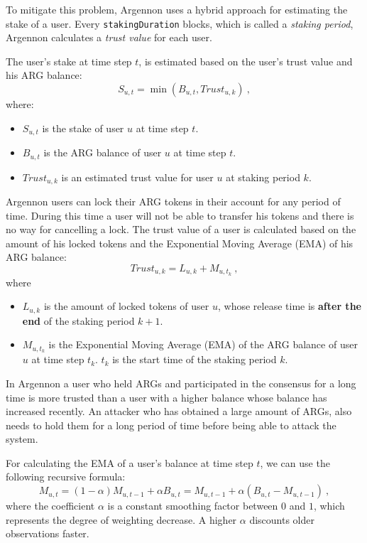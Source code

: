 To mitigate this problem, Argennon uses a hybrid approach for estimating the stake of a user.
Every \texttt{stakingDuration} blocks, which is called a \emph{staking period}, Argennon calculates
a \emph{trust value} for each user.

The user's stake
at time step \(t\), is estimated based on the user's trust value and his ARG balance:
\begin{equation}
    S_{u,t} = \min (B_{u,t}, Trust_{u,k})\ ,\label{eq:stake}
\end{equation}
where:
\begin{itemize}
    \item \(S_{u,t}\) is the stake of user \(u\) at time step \(t\).
    \item \(B_{u,t}\) is the ARG balance of user \(u\) at time step \(t\).
    \item \(Trust_{u,k}\) is an estimated trust value for user \(u\) at staking period \(k\).
\end{itemize}

Argennon users can lock their ARG tokens in their account for any period of time. During this time a user
will not be able to transfer his tokens and there is no way for cancelling a lock.
The trust value of a user is calculated based on the amount of his locked tokens and the
Exponential Moving Average (EMA) of his ARG balance:
\begin{equation}
    Trust_{u,k} = L_{u,k} + M_{u,t_k}\ ,\label{eq:trust}
\end{equation}
where
\begin{itemize}
    \item $L_{u,k}$ is the amount of locked tokens of user $u$, whose release time is \textbf{after the end} of
    the staking period $k+1$.
    \item $M_{u,t_k}$ is the Exponential Moving Average (EMA) of the ARG balance of user \(u\) at time step \(t_k\).
    $t_k$ is the start time of the staking period $k$.
\end{itemize}

In Argennon a user who held ARGs and participated in the consensus for a long time is more trusted
than a user with a higher balance whose balance has increased recently. An attacker who has obtained a large
amount of ARGs, also needs to hold them for a long period of time before being able to attack the system.

For calculating the EMA of a user's balance at time step \(t\), we can use the following
recursive formula:
\[
    M_{u,t} = (1 - \alpha) M_{u,t-1} + \alpha B_{u,t} = M_{u,t-1} + \alpha (B_{u,t} - M_{u,t-1})\ ,
\]
where the coefficient \(\alpha\) is a constant smoothing factor between \(0\) and \(1\), which represents the
degree of weighting decrease. A higher \(\alpha\) discounts older observations faster.

